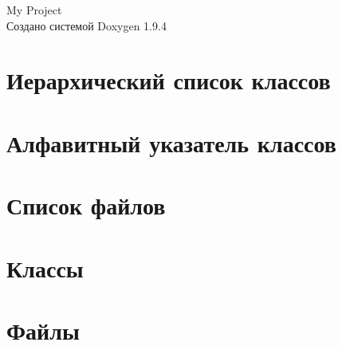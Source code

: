\documentclass[twoside]{book}
\newcommand{\+}{\discretionary{\mbox{\scriptsize$\hookleftarrow$}}{}{}}
\newcommand{\clearemptydoublepage}{%
    \newpage{\pagestyle{empty}\cleardoublepage}%
  }
\begin{document}
  \raggedbottom
    \hypersetup{pageanchor=false,
                bookmarksnumbered=true,
                pdfencoding=unicode
               }
  \begin{titlepage}
  \vspace*{7cm}
  \begin{center}%
  {\Large My Project}\\
  \vspace*{1cm}
  {\large Создано системой Doxygen 1.9.4}\\
  \end{center}
  \end{titlepage}
  \clearemptydoublepage
  \tableofcontents
  \clearemptydoublepage
  \hypersetup{pageanchor=true}
\chapter{Иерархический список классов}

\chapter{Алфавитный указатель классов}

\chapter{Список файлов}

\chapter{Классы}


\chapter{Файлы}




  \backmatter
  \newpage
  \clearemptydoublepage
  \printindex
\end{document}
